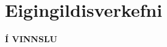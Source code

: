 \documentclass[A4paper,10pt,icelandic]{sphinxmanual}
\begin{document}
 \chapter{Eigingildisverkefni}
 \textbf{Í VINNSLU}
% 
% 
% 
% 
% 
% 
% 
\end{document}
